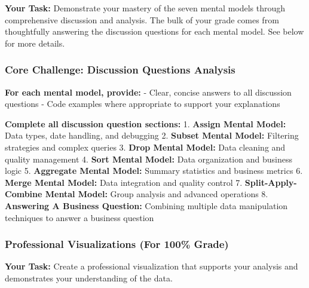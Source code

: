 \documentclass[
  letterpaper,
  DIV=11,
  numbers=noendperiod]{scrartcl}
\begin{document}
\textbf{Your Task:} Demonstrate your mastery of the seven mental models
through comprehensive discussion and analysis. The bulk of your grade
comes from thoughtfully answering the discussion questions for each
mental model. See below for more details.

\subsubsection{Core Challenge: Discussion Questions
Analysis}\label{core-challenge-discussion-questions-analysis}

\textbf{For each mental model, provide:} - Clear, concise answers to all
discussion questions - Code examples where appropriate to support your
explanations

\begin{tcolorbox}[enhanced jigsaw, toptitle=1mm, opacityback=0, colframe=quarto-callout-important-color-frame, leftrule=.75mm, arc=.35mm, opacitybacktitle=0.6, breakable, titlerule=0mm, coltitle=black, bottomtitle=1mm, title=\textcolor{quarto-callout-important-color}{\faExclamation}\hspace{0.5em}{📊 Discussion Questions Requirements}, colbacktitle=quarto-callout-important-color!10!white, rightrule=.15mm, left=2mm, bottomrule=.15mm, toprule=.15mm, colback=white]

\textbf{Complete all discussion question sections:} 1. \textbf{Assign
Mental Model:} Data types, date handling, and debugging 2.
\textbf{Subset Mental Model:} Filtering strategies and complex queries
3. \textbf{Drop Mental Model:} Data cleaning and quality management 4.
\textbf{Sort Mental Model:} Data organization and business logic 5.
\textbf{Aggregate Mental Model:} Summary statistics and business metrics
6. \textbf{Merge Mental Model:} Data integration and quality control 7.
\textbf{Split-Apply-Combine Mental Model:} Group analysis and advanced
operations 8. \textbf{Answering A Business Question:} Combining multiple
data manipulation techniques to answer a business question

\end{tcolorbox}

\subsubsection{Professional Visualizations (For 100\%
Grade)}\label{professional-visualizations-for-100-grade}

\textbf{Your Task:} Create a professional visualization that supports
your analysis and demonstrates your understanding of the data.
\end{document}
